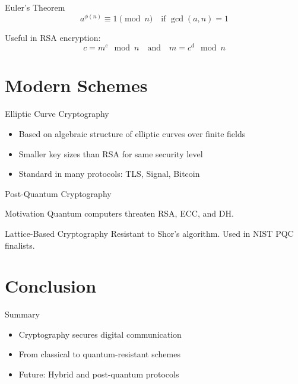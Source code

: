 \documentclass{beamer}
\begin{document}
\begin{frame}{Euler’s Theorem}
\[
a^{\phi(n)} \equiv 1 \pmod{n} \quad \text{if } \gcd(a,n)=1
\]

\pause

Useful in RSA encryption:
\[
c = m^e \mod n \quad\text{and}\quad m = c^d \mod n
\]
\end{frame}

\section{Modern Schemes}

\begin{frame}{Elliptic Curve Cryptography}
\begin{itemize}
\item Based on algebraic structure of elliptic curves over finite fields
\item Smaller key sizes than RSA for same security level
\item Standard in many protocols: TLS, Signal, Bitcoin
\end{itemize}
\end{frame}

\begin{frame}{Post-Quantum Cryptography}
\begin{alertblock}{Motivation}
Quantum computers threaten RSA, ECC, and DH.
\end{alertblock}

\begin{exampleblock}{Lattice-Based Cryptography}
Resistant to Shor's algorithm. Used in NIST PQC finalists.
\end{exampleblock}
\end{frame}

\section{Conclusion}

\begin{frame}{Summary}
\begin{itemize}
\item Cryptography secures digital communication
\item From classical to quantum-resistant schemes
\item Future: Hybrid and post-quantum protocols
\end{itemize}
\end{frame}
\end{document}

